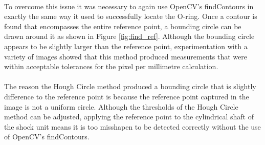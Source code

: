 			\\
			To overcome this issue it was necessary to again use OpenCV’s findContours in exactly the same way it used to successfully locate the O-ring. Once a contour is found that encompasses the entire reference point, a bounding circle can be drawn around it as shown in Figure \ref{fig:find_ref}. Although the bounding circle appears to be slightly larger than the reference point, experimentation with a variety of images showed that this method produced measurements that were within acceptable tolerances for the pixel per millimetre calculation.
			\\\\
			The reason the Hough Circle method produced a bounding circle that is slightly difference to the reference point is because the reference point captured in the image is not a uniform circle. Although the thresholds of the Hough Circle method can be adjusted, applying the reference point to the cylindrical shaft of the shock unit means it is too misshapen to be detected correctly without the use of OpenCV’s findContours.
